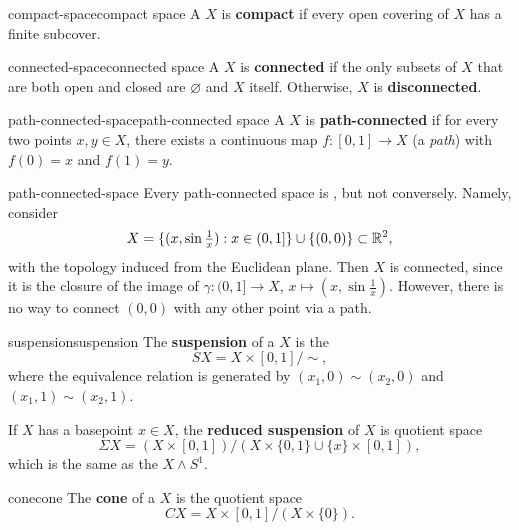 \begin{topic}{compact-space}{compact space}
    A  $X$ is \textbf{compact} if every open covering of $X$ has a finite subcover.
\end{topic}

\begin{topic}{connected-space}{connected space}
    A  $X$ is \textbf{connected} if the only subsets of $X$ that are both open and closed are $\varnothing$ and $X$ itself. Otherwise, $X$ is \textbf{disconnected}.
\end{topic}

\begin{topic}{path-connected-space}{path-connected space}
    A  $X$ is \textbf{path-connected} if for every two points $x, y \in X$, there exists a continuous map $f : [0, 1] \to X$ (a \textit{path}) with $f(0) = x$ and $f(1) = y$.
\end{topic}

\begin{example}{path-connected-space}
    Every path-connected space is , but not conversely. Namely, consider
    \[ X = \{ (x, \sin \tfrac{1}{x}) : x \in (0, 1] \} \cup \{ (0, 0) \} \subset \mathbb{R}^2 , \]
    with the topology induced from the Euclidean plane. Then $X$ is connected, since it is the closure of the image of $\gamma : (0, 1] \to X$, $x \mapsto (x, \sin \tfrac{1}{x})$. However, there is no way to connect $(0, 0)$ with any other point via a path.
\end{example}

\begin{topic}{suspension}{suspension}
    The \textbf{suspension} of a  $X$ is the 
    \[ S X = X \times [0, 1] / \sim{} , \]
    where the equivalence relation is generated by $(x_1, 0) \sim{} (x_2, 0)$ and $(x_1, 1) \sim{} (x_2, 1)$.
    
    If $X$ has a basepoint $x \in X$, the \textbf{reduced suspension} of $X$ is quotient space
    \[ \Sigma X = (X \times [0, 1]) / (X \times \{ 0, 1 \} \cup \{ x \} \times [0, 1]) , \]
    which is the same as the  $X \wedge S^1$.
\end{topic}

\begin{topic}{cone}{cone}
    The \textbf{cone} of a  $X$ is the quotient space
    \[ CX = X \times [0, 1] / (X \times \{ 0 \}) . \]
\end{topic}

